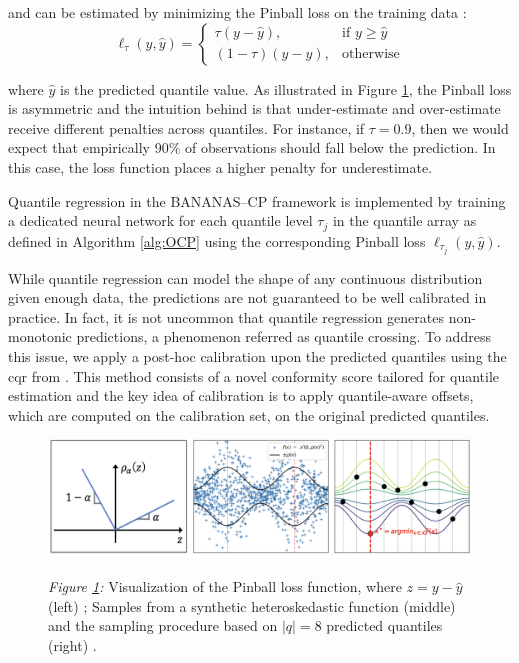 {\begin{description}[leftmargin=0cm, listparindent=\parindent]
	\noindent and can be estimated by minimizing the Pinball loss on the training data \cite{koenker1978regression}:
		\begin{equation}
			\ell_\tau(y, \hat{y}) = 
			\begin{cases}
			\tau (y - \hat{y}), & \text{if } y \geq \hat{y} \\
			(1 - \tau)(\hat{y} - y), & \text{otherwise}
			\end{cases}
		\label{pinballloss}
		\end{equation}
		
	\noindent where $\hat{y}$ is the predicted quantile value.	 As illustrated in Figure \ref{fig:CQR}, the Pinball loss is asymmetric and the intuition behind is that under-estimate and over-estimate receive different penalties across quantiles. 	For instance, if $\tau=0.9$, then we would expect that empirically 90\% of observations should fall below the prediction. In this case, the loss function places a higher penalty for underestimate.	
	
	Quantile regression in the BANANAS--CP framework is implemented by training a dedicated neural network for each quantile level $\tau_j$ in the quantile array as defined in Algorithm \ref{alg:OCP} using the corresponding Pinball loss $\ell_{\tau_j}(y, \hat{y})$. 
	
	 While quantile regression can model the shape of any continuous distribution given enough data, the predictions are not guaranteed to be well calibrated in practice. In fact, it is not uncommon that quantile regression generates non-monotonic predictions, a phenomenon referred as quantile crossing. To address this issue, we apply a post-hoc calibration upon the predicted quantiles using the \gls{cqr} from \cite{romano2019conformalized}. This method consists of a novel conformity score tailored for quantile estimation and the key idea of calibration is to apply quantile-aware offsets, which are computed on the calibration set, on the original predicted quantiles.
	 
	 \begin{figure}[t]	
	 	\centering
		\includegraphics[scale=0.53]{figs/pinball_loss_and_CQR.png}
		\label{fig:CQR}
		\parbox{\linewidth}{
	 	\vspace{0.5em}
 	 	{\small \textit{Figure \ref{fig:CQR}:} Visualization of the Pinball loss function, where $z=y - \hat{y}$ (left) \cite{romano2019conformalized}; Samples from a synthetic heteroskedastic function (middle) and  the sampling procedure based on $|q| = 8$ predicted quantiles (right) \cite{salinas2023optimizing}.
 	 	}
 		}
	\end{figure}
	 

\end{description}}
